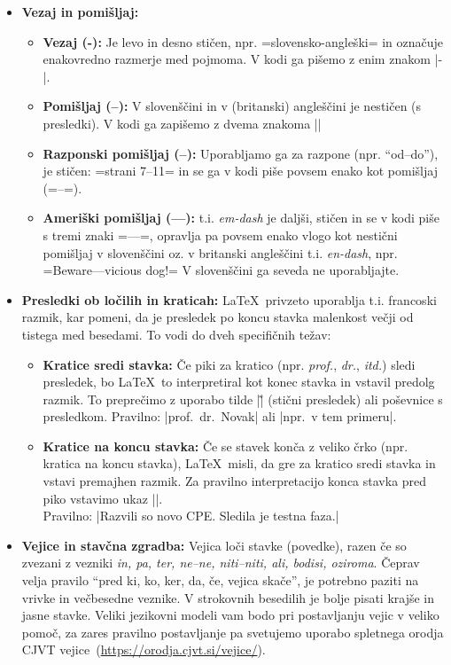 \documentclass[9pt]{style/friteza}
\begin{document}
\begin{itemize}
    \item \textbf{Vezaj in pomišljaj:} 
    \begin{itemize}
        \item \textbf{Vezaj (-):} Je levo in desno stičen, npr. \ltx=slovensko-angleški= in označuje enakovredno razmerje med pojmoma. V kodi ga pišemo z enim znakom \ltx|-|.
        \item \textbf{Pomišljaj (--):} V slovenščini in v (britanski) angleščini je nestičen (s presledki). V kodi ga zapišemo z dvema znakoma \ltx||
        \item \textbf{Razponski pomišljaj (--):} Uporabljamo ga za razpone (npr. \enquote{od--do}), je stičen: \ltx=strani 7--11= in se ga v kodi piše povsem enako kot pomišljaj (\ltx=--=).
        \item \textbf{Ameriški pomišljaj (---):} t.i. \textit{em-dash} je daljši, stičen in se v kodi piše s tremi znaki \ltx=---=, opravlja pa povsem enako vlogo kot nestični pomišljaj v slovenščini oz. v britanski angleščini t.i. \textit{en-dash}, npr. \ltx=Beware---vicious dog!= V slovenščini ga seveda ne uporabljajte.
    \end{itemize}

    \item \textbf{Presledki ob ločilih in kraticah:} \LaTeX\ privzeto uporablja t.i. francoski razmik, kar pomeni, da je presledek po koncu stavka malenkost večji od tistega med besedami. To vodi do dveh specifičnih težav:
    \begin{itemize}
        \item \textbf{Kratice sredi stavka:} Če piki za kratico (npr. \textit{prof.}, \textit{dr.}, \textit{itd.}) sledi presledek, bo \LaTeX\ to interpretiral kot konec stavka in vstavil predolg razmik. To preprečimo z uporabo tilde \ltx|\~| (stični presledek) ali poševnice s presledkom. Pravilno: \ltx|prof.~dr.~Novak| ali \ltx|npr.\ v tem primeru|.
        \item \textbf{Kratice na koncu stavka:} Če se stavek konča z veliko črko (npr. kratica na koncu stavka), \LaTeX\ misli, da gre za kratico sredi stavka in vstavi premajhen razmik. Za pravilno interpretacijo konca stavka pred piko vstavimo ukaz \ltx|\@|. \\Pravilno: \ltx|Razvili so novo CPE\@. Sledila je testna faza.|
    \end{itemize}
    
    \item \textbf{Vejice in stavčna zgradba:} Vejica loči stavke (povedke), razen če so zvezani z vezniki \textit{in, pa, ter, ne–ne, niti–niti, ali, bodisi, oziroma}. Čeprav velja pravilo \enquote{pred ki, ko, ker, da, če, vejica skače}, je potrebno paziti na vrivke in večbesedne veznike. V strokovnih besedilih je bolje pisati krajše in jasne stavke. Veliki jezikovni modeli vam bodo pri postavljanju vejic v veliko pomoč, za zares pravilno postavljanje pa svetujemo uporabo spletnega orodja CJVT vejice~(\url{https://orodja.cjvt.si/vejice/}).
    

\end{itemize}
\end{document}
